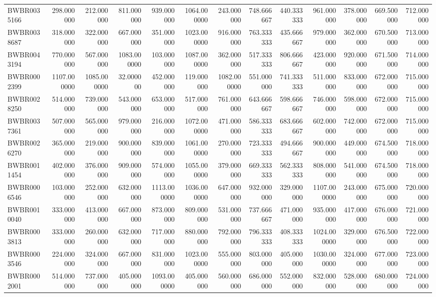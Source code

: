 \begin{longtable}{lrrrrrrrrrrrr}
BWBR0035166 & 298.000000 & 212.000000 & 811.000000 & 939.000000 & 1064.000000 & 243.000000 & 748.666667 & 440.333333 & 961.000000 & 378.000000 & 669.500000 & 712.000000 \\
BWBR0038687 & 318.000000 & 322.000000 & 667.000000 & 351.000000 & 1023.000000 & 916.000000 & 763.333333 & 435.666667 & 979.000000 & 362.000000 & 670.500000 & 713.000000 \\
BWBR0043194 & 770.000000 & 567.000000 & 1083.000000 & 103.000000 & 1087.000000 & 362.000000 & 517.333333 & 806.666667 & 423.000000 & 920.000000 & 671.500000 & 714.000000 \\
BWBR0002399 & 1107.000000 & 1085.000000 & 32.000000 & 452.000000 & 119.000000 & 1082.000000 & 551.000000 & 741.333333 & 511.000000 & 833.000000 & 672.000000 & 715.000000 \\
BWBR0028250 & 514.000000 & 739.000000 & 543.000000 & 653.000000 & 517.000000 & 761.000000 & 643.666667 & 598.666667 & 746.000000 & 598.000000 & 672.000000 & 715.000000 \\
BWBR0037361 & 507.000000 & 565.000000 & 979.000000 & 216.000000 & 1072.000000 & 471.000000 & 586.333333 & 683.666667 & 602.000000 & 742.000000 & 672.000000 & 715.000000 \\
BWBR0026270 & 365.000000 & 219.000000 & 900.000000 & 839.000000 & 1061.000000 & 270.000000 & 723.333333 & 494.666667 & 900.000000 & 449.000000 & 674.500000 & 718.000000 \\
BWBR0011454 & 402.000000 & 376.000000 & 909.000000 & 574.000000 & 1055.000000 & 379.000000 & 669.333333 & 562.333333 & 808.000000 & 541.000000 & 674.500000 & 718.000000 \\
BWBR0006546 & 103.000000 & 252.000000 & 632.000000 & 1113.000000 & 1036.000000 & 647.000000 & 932.000000 & 329.000000 & 1107.000000 & 243.000000 & 675.000000 & 720.000000 \\
BWBR0010040 & 333.000000 & 413.000000 & 667.000000 & 873.000000 & 809.000000 & 531.000000 & 737.666667 & 471.000000 & 935.000000 & 417.000000 & 676.000000 & 721.000000 \\
BWBR0003813 & 333.000000 & 260.000000 & 632.000000 & 717.000000 & 880.000000 & 792.000000 & 796.333333 & 408.333333 & 1024.000000 & 329.000000 & 676.500000 & 722.000000 \\
BWBR0003546 & 224.000000 & 324.000000 & 667.000000 & 831.000000 & 1023.000000 & 555.000000 & 803.000000 & 405.000000 & 1030.000000 & 324.000000 & 677.000000 & 723.000000 \\
BWBR0002001 & 514.000000 & 737.000000 & 405.000000 & 1093.000000 & 405.000000 & 560.000000 & 686.000000 & 552.000000 & 832.000000 & 528.000000 & 680.000000 & 724.000000 \\

\end{longtable}
